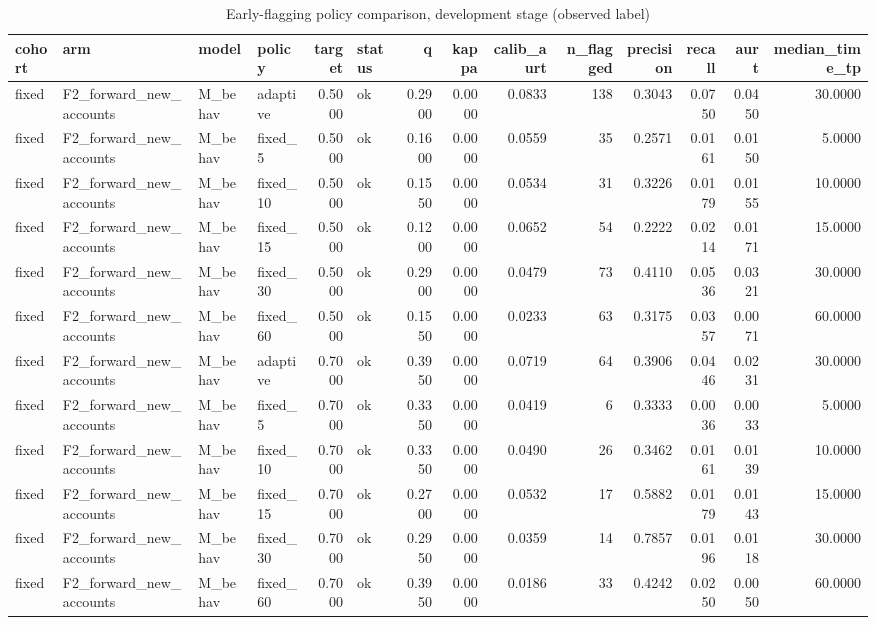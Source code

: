 \begin{table}
\caption{Early-flagging policy comparison, development stage (observed label)}
\label{tab:tab_policy}
\begin{tabular}{llllrlrrrrrrrr}
\toprule
cohort & arm & model & policy & target & status & q & kappa & calib\_aurt & n\_flagged & precision & recall & aurt & median\_time\_tp \\
\midrule
fixed & F2\_forward\_new\_accounts & M\_behav & adaptive & 0.5000 & ok & 0.2900 & 0.0000 & 0.0833 & 138 & 0.3043 & 0.0750 & 0.0450 & 30.0000 \\
fixed & F2\_forward\_new\_accounts & M\_behav & fixed\_5 & 0.5000 & ok & 0.1600 & 0.0000 & 0.0559 & 35 & 0.2571 & 0.0161 & 0.0150 & 5.0000 \\
fixed & F2\_forward\_new\_accounts & M\_behav & fixed\_10 & 0.5000 & ok & 0.1550 & 0.0000 & 0.0534 & 31 & 0.3226 & 0.0179 & 0.0155 & 10.0000 \\
fixed & F2\_forward\_new\_accounts & M\_behav & fixed\_15 & 0.5000 & ok & 0.1200 & 0.0000 & 0.0652 & 54 & 0.2222 & 0.0214 & 0.0171 & 15.0000 \\
fixed & F2\_forward\_new\_accounts & M\_behav & fixed\_30 & 0.5000 & ok & 0.2900 & 0.0000 & 0.0479 & 73 & 0.4110 & 0.0536 & 0.0321 & 30.0000 \\
fixed & F2\_forward\_new\_accounts & M\_behav & fixed\_60 & 0.5000 & ok & 0.1550 & 0.0000 & 0.0233 & 63 & 0.3175 & 0.0357 & 0.0071 & 60.0000 \\
fixed & F2\_forward\_new\_accounts & M\_behav & adaptive & 0.7000 & ok & 0.3950 & 0.0000 & 0.0719 & 64 & 0.3906 & 0.0446 & 0.0231 & 30.0000 \\
fixed & F2\_forward\_new\_accounts & M\_behav & fixed\_5 & 0.7000 & ok & 0.3350 & 0.0000 & 0.0419 & 6 & 0.3333 & 0.0036 & 0.0033 & 5.0000 \\
fixed & F2\_forward\_new\_accounts & M\_behav & fixed\_10 & 0.7000 & ok & 0.3350 & 0.0000 & 0.0490 & 26 & 0.3462 & 0.0161 & 0.0139 & 10.0000 \\
fixed & F2\_forward\_new\_accounts & M\_behav & fixed\_15 & 0.7000 & ok & 0.2700 & 0.0000 & 0.0532 & 17 & 0.5882 & 0.0179 & 0.0143 & 15.0000 \\
fixed & F2\_forward\_new\_accounts & M\_behav & fixed\_30 & 0.7000 & ok & 0.2950 & 0.0000 & 0.0359 & 14 & 0.7857 & 0.0196 & 0.0118 & 30.0000 \\
fixed & F2\_forward\_new\_accounts & M\_behav & fixed\_60 & 0.7000 & ok & 0.3950 & 0.0000 & 0.0186 & 33 & 0.4242 & 0.0250 & 0.0050 & 60.0000 \\

\end{tabular}
\end{table}
